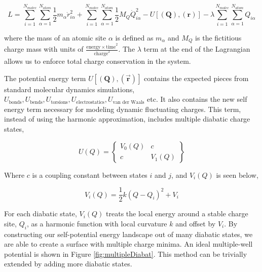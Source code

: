 \begin{equation}
L = \sum^{N_{molec}}_{i=1}\sum^{N_{atom}}_{\alpha = 1} \frac{1}{2}m_{\alpha} \dot{r}^2_{i\alpha} + \sum^{N_{molec}}_{i=1}\sum^{N_{atom}}_{\alpha = 1} \frac{1}{2}M_Q\dot{Q}^2_{i\alpha} - U[(\mathbf{Q}),(\mathbf{r})] - \lambda \sum^{N_{molec}}_{i=1}\sum^{N_{atom}}_{\alpha = 1} Q_{i\alpha}
\end{equation}

where the mass of an atomic site $\alpha$ is defined as $m_\alpha$ and $M_Q$ is
the fictitious charge mass with units of $\frac{\mathrm{energy\times
time}^2}{\mathrm{charge}^2}$.  The $\lambda$ term at the end of the Lagrangian
allows us to enforce total charge conservation in the system.

The potential energy term $U[(\mathbf{Q}),(\vec{\mathbf{r}})]$ contains the
expected pieces from standard molecular dynamics simulations,
$U_{\text{bonds}}, U_{\text{bends}}, U_{\text{torsions}},
U_{\text{electrostatics}}, U_{\text{van der Waals}}$ etc. It also contains the
new self energy term necessary for modeling dynamic fluctuating charges. This
term, instead of using the harmonic approximation, includes multiple diabatic
charge states,

\begin{equation}
U(Q) =
\begin{Bmatrix}
 V_0(Q) & c  \\
 c   & V_1(Q)
\end{Bmatrix}
\end{equation}

Where $c$ is a coupling constant between states $i$ and $j$, and $V_i(Q)$ is
seen below,

\begin{equation*}
V_i(Q) = \frac{1}{2}k(Q - Q_i)^2 + V_i
\end{equation*}

For each diabatic state, $V_i(Q)$ treats the local energy around a stable charge
site, $Q_i$, as a harmonic function with local curvature $k$ and offset by $V_i$.
By constructing our self-potential energy landscape out of many
diabatic states, we are able to create a surface with multiple charge minima.
An ideal multiple-well potential is shown in Figure \ref{fig:multipleDiabat}.
This method can be trivially extended by adding more diabatic states.

